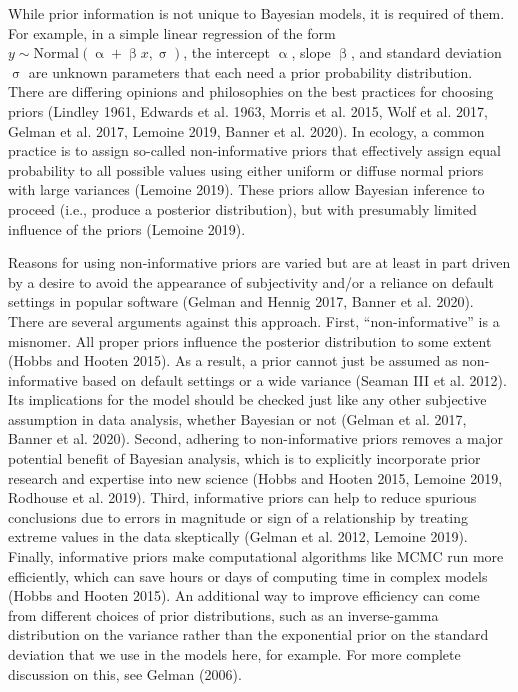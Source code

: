 \documentclass[
  12pt,
]{article}
\begin{document}
While prior information is not unique to Bayesian models, it is required
of them. For example, in a simple linear regression of the form
\(y \sim \text{Normal}(\upalpha + \upbeta x, \upsigma)\), the intercept
\(\upalpha\), slope \(\upbeta\), and standard deviation \(\upsigma\) are
unknown parameters that each need a prior probability distribution.
There are differing opinions and philosophies on the best practices for
choosing priors (Lindley 1961, Edwards et al. 1963, Morris et al. 2015,
Wolf et al. 2017, Gelman et al. 2017, Lemoine 2019, Banner et al. 2020).
In ecology, a common practice is to assign so-called non-informative
priors that effectively assign equal probability to all possible values
using either uniform or diffuse normal priors with large variances
(Lemoine 2019). These priors allow Bayesian inference to proceed (i.e.,
produce a posterior distribution), but with presumably limited influence
of the priors (Lemoine 2019).

Reasons for using non-informative priors are varied but are at least in
part driven by a desire to avoid the appearance of subjectivity and/or a
reliance on default settings in popular software (Gelman and Hennig
2017, Banner et al. 2020). There are several arguments against this
approach. First, ``non-informative'' is a misnomer. All proper priors
influence the posterior distribution to some extent (Hobbs and Hooten
2015). As a result, a prior cannot just be assumed as non-informative
based on default settings or a wide variance (Seaman III et al. 2012).
Its implications for the model should be checked just like any other
subjective assumption in data analysis, whether Bayesian or not (Gelman
et al. 2017, Banner et al. 2020). Second, adhering to non-informative
priors removes a major potential benefit of Bayesian analysis, which is
to explicitly incorporate prior research and expertise into new science
(Hobbs and Hooten 2015, Lemoine 2019, Rodhouse et al. 2019). Third,
informative priors can help to reduce spurious conclusions due to errors
in magnitude or sign of a relationship by treating extreme values in the
data skeptically (Gelman et al. 2012, Lemoine 2019). Finally,
informative priors make computational algorithms like MCMC run more
efficiently, which can save hours or days of computing time in complex
models (Hobbs and Hooten 2015). An additional way to improve efficiency
can come from different choices of prior distributions, such as an
inverse-gamma distribution on the variance rather than the exponential
prior on the standard deviation that we use in the models here, for
example. For more complete discussion on this, see Gelman (2006).
\end{document}
